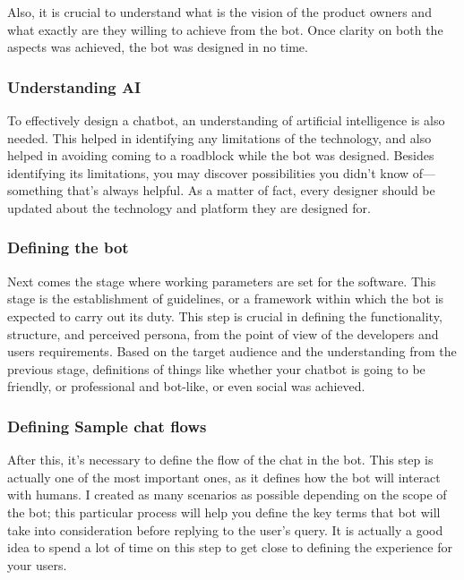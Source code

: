 \documentclass[14pt]{extarticle}
\begin{document}
Also, it is crucial to understand what is the vision of the product owners and what exactly are they willing to achieve from the bot. Once clarity on both the aspects was achieved, the bot was designed in no time.

\subsubsection{Understanding AI}

To effectively design a chatbot, an understanding of artificial intelligence is also needed. This helped in identifying any limitations of the technology, and also helped in avoiding coming to a roadblock while the bot was designed. Besides identifying its limitations, you may discover possibilities you didn't know of— something that's always helpful. As a matter of fact, every designer should be updated about the technology and platform they are designed for.

\subsubsection{Defining the bot}

Next comes the stage where working parameters are set for the software. This stage is the establishment of guidelines, or a framework within which the bot is expected to carry out its duty. This step is crucial in defining the functionality, structure, and perceived persona, from the point of view of the developers and users requirements. Based on the target audience and the understanding from the previous stage, definitions of things like  whether your chatbot is going to be friendly, or professional and bot-like, or even social was achieved.

\subsubsection{Defining Sample chat flows}

After this, it's necessary to define the flow of the chat in the bot. This step is actually one of the most important ones, as it defines how the bot will interact with humans. I created as many scenarios as possible depending on the scope of the bot; this particular process will help you define the key terms that bot will take into consideration before replying to the user's query. It is actually a good idea to spend a lot of time on this step to get close to defining the experience for your users.
\end{document}
